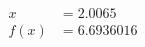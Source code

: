 \documentclass[preview]{standalone}
\begin{document}
\begin{align*}
x &= 2.0065\\f(x) &= 6.6936016
\end{align*}
\end{document}
